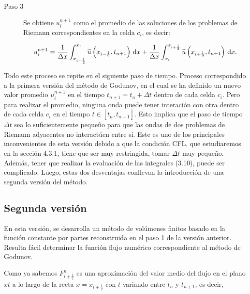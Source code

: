 \begin{description}
  \item[Paso 3]

        Se obtiene $u^{n+1}_{i}$ como el promedio de las soluciones
        de los problemas de Riemann correspondientes en la celda
        $c_{i}$, es decir:

        \begin{equation*}
          u^{n+1}_{i}=
          \frac{1}{\Delta x}
          \int_{x_{i-\frac{1}{2}}}^{x_{i}}
          \widetilde{u}
          \left(x_{i-\frac{1}{2}},t_{n+1}\right)
          \dl x+
          \frac{1}{\Delta x}
          \int_{x_{i}}^{x_{i+\frac{1}{2}}}
          \widetilde{u}
          \left(
          x_{i+\frac{1}{2}},t_{n+1}
          \right)
          \dl x.
        \end{equation*}
\end{description}

Todo este proceso se repite en el siguiente paso de tiempo.
Proceso correspondido a la primera versión del método de Godunov, en
el cual se ha definido un nuevo valor promedio $u^{n+1}_{i}$ en el
tiempo $t_{n+1}=t_{n}+\Delta t$ dentro de cada celda $c_{i}$.
Pero para realizar el promedio, ninguna onda puede tener interación
con otra dentro de cada celda $c_{i}$ en el tiempo
$t\in\left[t_{n},t_{n+1}\right]$.
Esto implica que el paso de tiempo $\Delta t$ sea lo suficientemente
pequeño para que las ondas de dos problemas de Riemann adyacentes no
interactúen entre sí.
Este es uno de los principales inconvenientes de esta versión debido
a que la condición CFL, que estudiaremos en la sección 4.3.1, tiene
que ser muy restringida, tomar $\Delta t$ muy pequeño.
Además, tener que realizar la evaluación de las integrales (3.10),
puede ser complicado.
Luego, estas dos desventajas conllevan la introducción de una segunda
versión del método.

\subsection{Segunda versión}

En esta versión, se desarrolla un método de volúmenes finitos basado
en la función constante por partes reconstruida en el paso 1 de la
versión anterior.
Resulta fácil determinar la función flujo numérico correspondiente al
método de Godunov.

Como ya sabemos $F^{n}_{i+\frac{1}{2}}$ es una aproximación del valor
medio del flujo en el plano $xt$ a lo largo de la recta
$x=x_{i+\frac{1}{2}}$ con $t$ variando entre $t_{n}$ y $t_{n+1}$,
es decir,

